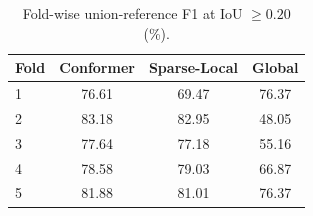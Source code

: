 \begin{table}[!t]
\centering
\caption{Fold-wise union-reference F1 at IoU $\geq0.20$ (\%).}
\label{tab:mass-fold-results}
\footnotesize
\begin{tabular}{lccc}
\toprule
Fold & Conformer & Sparse-Local & Global \\ 
\midrule
1 & 76.61 & 69.47 & 76.37 \\
2 & 83.18 & 82.95 & 48.05 \\
3 & 77.64 & 77.18 & 55.16 \\
4 & 78.58 & 79.03 & 66.87 \\
5 & 81.88 & 81.01 & 76.37 \\
\bottomrule
\end{tabular}
\end{table}
